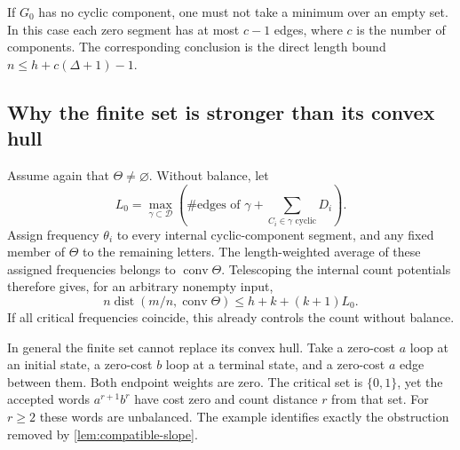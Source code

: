 If $G_0$ has no cyclic component, one must not take a minimum over an empty
set. In this case each zero segment has at most $c-1$ edges, where $c$ is
the number of components. The corresponding conclusion is the direct
length bound $n\leqslant h+c(\Delta+1)-1$.

\subsection{Why the finite set is stronger than its convex hull}

Assume again that $\Theta\ne\varnothing$. Without balance, let
$$
 L_0=\max_{\gamma\subset\mathcal D}
 \left(\#\text{edges of }\gamma+\sum_{C_i\in\gamma\text{ cyclic}}D_i\right).
$$
Assign frequency $\theta_i$ to every internal cyclic-component segment,
and any fixed member of $\Theta$ to the remaining letters. The
length-weighted average of these assigned frequencies belongs to
$\operatorname{conv}\Theta$. Telescoping the internal count potentials
therefore gives, for an arbitrary nonempty input,
\begin{equation}
 n\operatorname{dist}(m/n,\operatorname{conv}\Theta)
 \leqslant h+k+(k+1)L_0.
 \label{eq:convex-hull-bound}
\end{equation}
If all critical frequencies coincide, this already controls the count
without balance.

In general the finite set cannot replace its convex hull. Take a zero-cost
$a$ loop at an initial state, a zero-cost $b$ loop at a terminal state,
and a zero-cost $a$ edge between them. Both endpoint weights are zero.
The critical set is $\{0,1\}$, yet the accepted words $a^{r+1}b^r$ have
cost zero and count distance $r$ from that set. For $r\geqslant2$ these
words are unbalanced. The example identifies exactly the obstruction
removed by \cref{lem:compatible-slope}.
